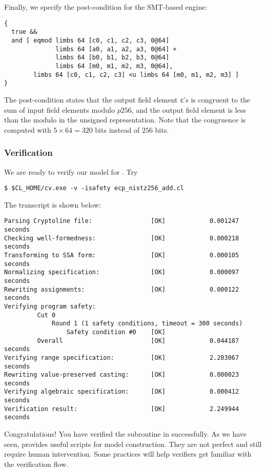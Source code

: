 \documentclass{amsproc}
\begin{document}
Finally, we specify the post-condition for the SMT-based engine:
\begin{verbatim}
{
  true && 
  and [ eqmod limbs 64 [c0, c1, c2, c3, 0@64]
              limbs 64 [a0, a1, a2, a3, 0@64] + 
              limbs 64 [b0, b1, b2, b3, 0@64]
              limbs 64 [m0, m1, m2, m3, 0@64],
        limbs 64 [c0, c1, c2, c3] <u limbs 64 [m0, m1, m2, m3] ]
}
\end{verbatim}
The post-condition states that the output field element \texttt{c}'s
is congruent to the sum of input field elements modulo $p256$, and the
output field element is less than the modulo in the unsigned
representation. Note that the congruence is computed with $5\times
64=320$ bits instead of $256$ bits.

\subsubsection{Verification}

We are ready to verify our \cryptoline model for \nistzadd. Try
\begin{verbatim}
$ $CL_HOME/cv.exe -v -isafety ecp_nistz256_add.cl
\end{verbatim}
The transcript is shown below:
\begin{verbatim}
Parsing Cryptoline file:                [OK]            0.001247 seconds
Checking well-formedness:               [OK]            0.000218 seconds
Transforming to SSA form:               [OK]            0.000105 seconds
Normalizing specification:              [OK]            0.000097 seconds
Rewriting assignments:                  [OK]            0.000122 seconds
Verifying program safety:
         Cut 0
             Round 1 (1 safety conditions, timeout = 300 seconds)
                 Safety condition #0    [OK]
         Overall                        [OK]            0.044187 seconds
Verifying range specification:          [OK]            2.203067 seconds
Rewriting value-preserved casting:      [OK]            0.000023 seconds
Verifying algebraic specification:      [OK]            0.000412 seconds
Verification result:                    [OK]            2.249944 seconds
\end{verbatim}

Congratulations! You have verified the \xeightysix \nistzadd
subroutine in \openssl successfully. As we have seen, \cryptoline
provides useful scripts for model construction. They are not perfect
and still require human intervention. Some practices will help
verifiers get familiar with the verification flow.
\end{document}

